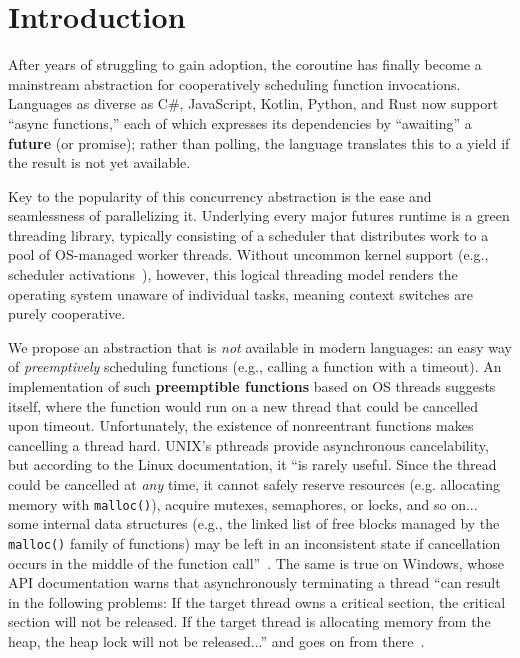 \section{Introduction}
\label{sec:intro}

After years of struggling to gain adoption, the coroutine has finally become a
mainstream abstraction for cooperatively scheduling function invocations.  Languages
as diverse as C\#, JavaScript, Kotlin, Python, and Rust now support ``async
functions,'' each of which expresses its dependencies by ``awaiting'' a
\textbf{future} (or promise); rather than polling, the language translates this to a
yield if the result is not yet available.

Key to the popularity of this concurrency abstraction is the ease and seamlessness of
parallelizing it.  Underlying every major futures runtime is a green threading
library, typically consisting of a scheduler that distributes work to a pool of
OS-managed worker threads.  Without uncommon kernel
support (e.g., scheduler activations~\cite{anderson:sosp1991}), however, this logical
threading model renders the operating system unaware of individual tasks, meaning
context switches are purely cooperative.

We propose an abstraction that is \textit{not} available in modern languages:\@
an easy way of \textit{preemptively} scheduling functions (e.g., calling a function
with a timeout).  An implementation of such \textbf{preemptible functions} based on
OS threads suggests itself, where the function would run on a new thread that
could be cancelled upon timeout.  Unfortunately, the existence of nonreentrant
functions makes cancelling a thread hard.  UNIX's pthreads provide
asynchronous cancelability, but according to the Linux documentation, it ``is rarely
useful.  Since the thread could be cancelled at \textit{any} time, it cannot safely
reserve resources (e.g.  allocating memory with \texttt{malloc()}), acquire mutexes,
semaphores, or locks, and so on... some internal data structures (e.g., the linked
list of free blocks managed by the \texttt{malloc()} family of functions) may be left
in an inconsistent state if cancellation occurs in the middle of the function
call''~\cite{pthreadsetcanceltype-manpage}.  The same is true on Windows, whose API
documentation warns that asynchronously terminating a thread ``can result in the
following problems: If the target thread owns a critical section, the critical
section will not be released.  If the target thread is allocating memory from the
heap, the heap lock will not be released...'' and goes on from
there~\cite{www-microsoft-terminatethread}.

